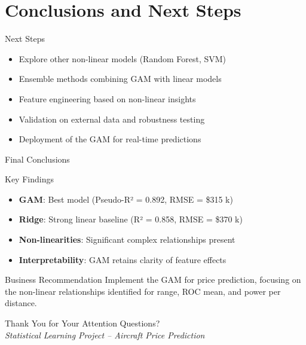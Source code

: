 \documentclass{beamer}
\begin{document}
\section{Conclusions and Next Steps}
\begin{frame}{Next Steps}
  \begin{itemize}
    \item Explore other non-linear models (Random Forest, SVM)
    \item Ensemble methods combining GAM with linear models
    \item Feature engineering based on non-linear insights
    \item Validation on external data and robustness testing
    \item Deployment of the GAM for real-time predictions
  \end{itemize}
\end{frame}

\begin{frame}{Final Conclusions}
  \begin{block}{Key Findings}
    \begin{itemize}
      \item \textbf{GAM}: Best model (Pseudo-R² = 0.892, RMSE = \$315 k)
      \item \textbf{Ridge}: Strong linear baseline (R² = 0.858, RMSE = \$370 k)
      \item \textbf{Non-linearities}: Significant complex relationships present
      \item \textbf{Interpretability}: GAM retains clarity of feature effects
    \end{itemize}
  \end{block}
  \begin{alertblock}{Business Recommendation}
    Implement the GAM for price prediction, focusing on the non-linear relationships identified for range, ROC mean, and power per distance.
  \end{alertblock}
\end{frame}

\begin{frame}{Thank You for Your Attention}
  Questions?\\[1em]
  \textit{Statistical Learning Project – Aircraft Price Prediction}
\end{frame}
\end{document}
